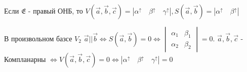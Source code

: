 \begin{corollary}
	Если \(\mathfrak{E}\) - правый ОНБ, то \(V(\vec{a}, \vec{b}, \vec{c}) = |\alpha^{\uparrow} \quad \beta^{\uparrow} \quad \gamma^{\uparrow}|, S(\vec{a}, \vec{b}) = |\alpha^{\uparrow} \quad \beta^{\uparrow}|\)
\end{corollary}
\begin{corollary}
	В произвольном базсе \(V_2\) \(\vec{a} || \vec{b} \Longleftrightarrow S(\vec{a}, \vec{b}) = 0 \Longleftrightarrow \begin{vmatrix}
		\alpha_1 & \beta_1 \\
		\alpha_2 & \beta_2
	\end{vmatrix} = 0\). \newline
	\(\vec{a}, \vec{b}, \vec{c}\) - Компланарны \(\Longleftrightarrow V(\vec{a}, \vec{b}, \vec{c}) = 0 \Longleftrightarrow |\alpha^{\uparrow} \quad \beta^{\uparrow} \quad \gamma^{\uparrow}| = 0\)
\end{corollary}
